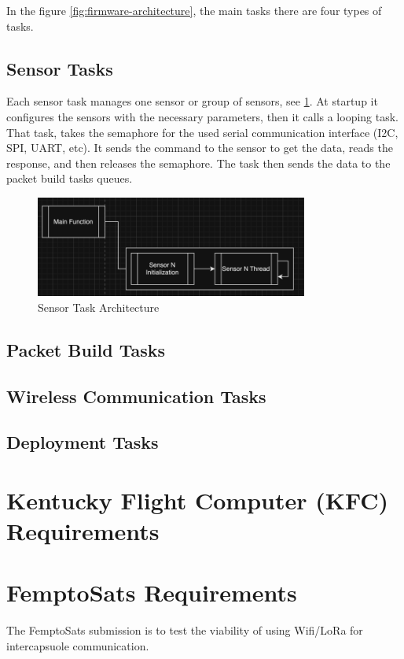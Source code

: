 \documentclass{article}
\begin{document}
\par In the figure \ref{fig:firmware-architecture}, the main tasks there are four types of tasks. 

\subsection{Sensor Tasks}
\par Each sensor task manages one sensor or group of sensors, see \ref{fig:sensor-architecture}. At startup it configures the sensors with the necessary parameters, then it calls a looping task. That task, takes the semaphore for the used serial communication interface (I2C, SPI, UART, etc). It sends the command to the sensor to get the data, reads the response, and then releases the semaphore. The task then sends the data to the packet build tasks queues.

\begin{figure} [H]
    \centering
    \includegraphics[width=0.8\textwidth]{images/sensor-architechure.png}
    \caption{Sensor Task Architecture}
    \label{fig:sensor-architecture} 
\end{figure} 

\subsection{Packet Build Tasks}
\subsection{Wireless Communication Tasks}
\subsection{Deployment Tasks}
\section{Kentucky Flight Computer (KFC) Requirements}

\section{FemptoSats Requirements}
\par The FemptoSats submission is to test the viability of using Wifi/LoRa for intercapsuole communication. 
\end{document}
